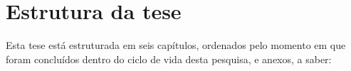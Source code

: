 











\section{Estrutura da tese}

Esta tese está estruturada em seis capítulos, ordenados pelo momento em que foram concluídos dentro do ciclo de vida desta pesquisa, e anexos, a saber:

